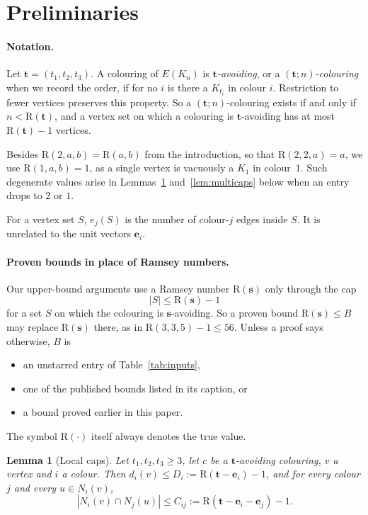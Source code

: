 \documentclass[11pt]{article}
\theoremstyle{spacedplain}
\newtheorem{lemma}[theorem]{Lemma}
\theoremstyle{spaceddef}
\theoremstyle{spacedremark}
\newcommand{\R}{\mathrm{R}}
\newcommand{\bt}{\mathbf{t}}
\newcommand{\e}{\mathbf{e}}
\begin{document}
\section{Preliminaries}\label{sec:prelim}

\paragraph{Notation.}
Let $\bt=(t_1,t_2,t_3)$.
A colouring of $E(K_n)$ is \emph{$\bt$-avoiding}, or a \emph{$(\bt;n)$-colouring} when we record the order, if for no $i$ is there a $K_{t_i}$ in colour $i$.
Restriction to fewer vertices preserves this property.
So a $(\bt;n)$-colouring exists if and only if $n<\R(\bt)$, and a vertex set on which a colouring is $\bt$-avoiding has at most $\R(\bt)-1$ vertices.

Besides $\R(2,a,b)=\R(a,b)$ from the introduction, so that $\R(2,2,a)=a$, we use $\R(1,a,b)=1$, as a single vertex is vacuously a $K_1$ in colour~$1$.
Such degenerate values arise in Lemmas~\ref{lem:caps} and~\ref{lem:multicaps} below when an entry drops to $2$ or $1$.

For a vertex set $S$, $e_j(S)$ is the number of colour-$j$ edges inside $S$.
It is unrelated to the unit vectors $\e_i$.

\paragraph{Proven bounds in place of Ramsey numbers.}
Our upper-bound arguments use a Ramsey number $\R(\mathbf s)$ only through the cap
\[
|S|\le\R(\mathbf s)-1
\]
for a set $S$ on which the colouring is $\mathbf s$-avoiding.
So a proven bound $\R(\mathbf s)\le B$ may replace $\R(\mathbf s)$ there, as in $\R(3,3,5)-1\le 56$.
Unless a proof says otherwise, $B$ is
\begin{itemize}
\item an unstarred entry of Table~\ref{tab:inputs},
\item one of the published bounds listed in its caption, or
\item a bound proved earlier in this paper.
\end{itemize}
The symbol $\R(\cdot)$ itself always denotes the true value.

\begin{lemma}[Local caps]\label{lem:caps}
Let $t_1,t_2,t_3\ge 3$, let $c$ be a $\bt$-avoiding colouring, $v$ a vertex and $i$ a colour.
Then $d_i(v)\le D_i:=\R(\bt-\e_i)-1$, and for every colour $j$ and every $u\in N_i(v)$,
\[
|N_i(v)\cap N_j(u)|\le C_{ij}:=\R(\bt-\e_i-\e_j)-1 .
\]
\end{lemma}
\end{document}

